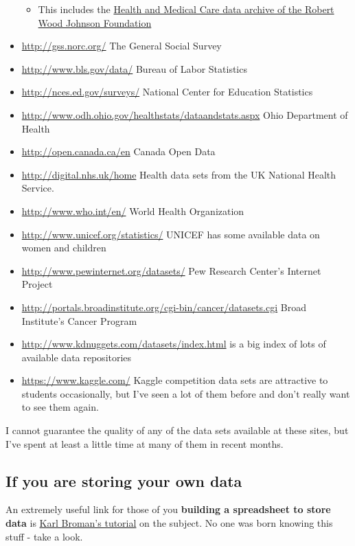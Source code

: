 \documentclass[]{book}
\providecommand{\tightlist}{%
  \setlength{\itemsep}{0pt}\setlength{\parskip}{0pt}}
\theoremstyle{definition}
\theoremstyle{definition}
\theoremstyle{definition}
\theoremstyle{remark}
\begin{document}
\begin{itemize}
  \begin{itemize}
  \tightlist
  \item
    This includes the
    \href{http://www.icpsr.umich.edu/icpsrweb/HMCA/}{Health and Medical
    Care data archive of the Robert Wood Johnson Foundation}
  \end{itemize}
\item
  \url{http://gss.norc.org/} The General Social Survey
\item
  \url{http://www.bls.gov/data/} Bureau of Labor Statistics
\item
  \url{http://nces.ed.gov/surveys/} National Center for Education
  Statistics
\item
  \url{http://www.odh.ohio.gov/healthstats/dataandstats.aspx} Ohio
  Department of Health
\item
  \url{http://open.canada.ca/en} Canada Open Data
\item
  \url{http://digital.nhs.uk/home} Health data sets from the UK National
  Health Service.
\item
  \url{http://www.who.int/en/} World Health Organization
\item
  \url{http://www.unicef.org/statistics/} UNICEF has some available data
  on women and children
\item
  \url{http://www.pewinternet.org/datasets/} Pew Research Center's
  Internet Project
\item
  \url{http://portals.broadinstitute.org/cgi-bin/cancer/datasets.cgi}
  Broad Institute's Cancer Program
\item
  \url{http://www.kdnuggets.com/datasets/index.html} is a big index of
  lots of available data repositories
\item
  \url{https://www.kaggle.com/} Kaggle competition data sets are
  attractive to students occasionally, but I've seen a lot of them
  before and don't really want to see them again.
\end{itemize}

I cannot guarantee the quality of any of the data sets available at
these sites, but I've spent at least a little time at many of them in
recent months.

\hypertarget{if-you-are-storing-your-own-data}{%
\subsection{If you are storing your own
data}\label{if-you-are-storing-your-own-data}}

An extremely useful link for those of you \textbf{building a spreadsheet
to store data} is \href{http://kbroman.org/dataorg/}{Karl Broman's
tutorial} on the subject. No one was born knowing this stuff - take a
look.
\end{document}
